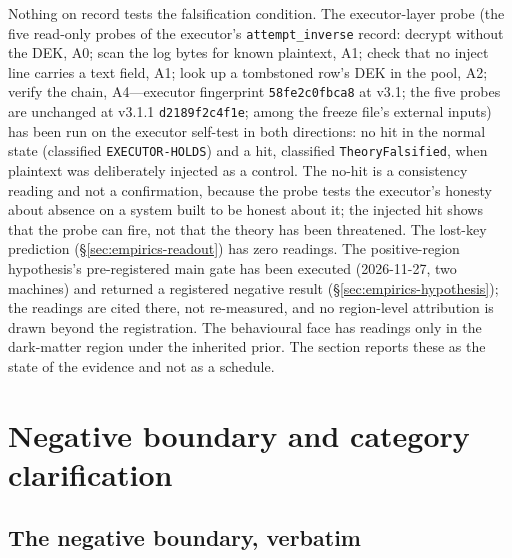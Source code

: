 \documentclass[11pt,a4paper]{article}
\begin{document}
Nothing on record tests the falsification condition. The executor-layer probe (the five read-only probes of the executor's \texttt{attempt\_inverse} record: decrypt without the DEK, A0; scan the log bytes for known plaintext, A1; check that no inject line carries a text field, A1; look up a tombstoned row's DEK in the pool, A2; verify the chain, A4---executor fingerprint \texttt{58fe2c0fbca8} at v3.1; the five probes are unchanged at v3.1.1 \texttt{d2189f2c4f1e}; among the freeze file's external inputs) has been run on the executor self-test in both directions: no hit in the normal state (classified \texttt{EXECUTOR-HOLDS}) and a hit, classified \texttt{TheoryFalsified}, when plaintext was deliberately injected as a control. The no-hit is a consistency reading and not a confirmation, because the probe tests the executor's honesty about absence on a system built to be honest about it; the injected hit shows that the probe can fire, not that the theory has been threatened. The lost-key prediction (\S\ref{sec:empirics-readout}) has zero readings. The positive-region hypothesis's pre-registered main gate has been executed (2026-11-27, two machines) and returned a registered negative result (\S\ref{sec:empirics-hypothesis}); the readings are cited there, not re-measured, and no region-level attribution is drawn beyond the registration. The behavioural face has readings only in the dark-matter region under the inherited prior. The section reports these as the state of the evidence and not as a schedule.

\section{Negative boundary and category clarification}
\label{sec:boundary}

\subsection{The negative boundary, verbatim}
\label{sec:boundary-verbatim}
\end{document}
